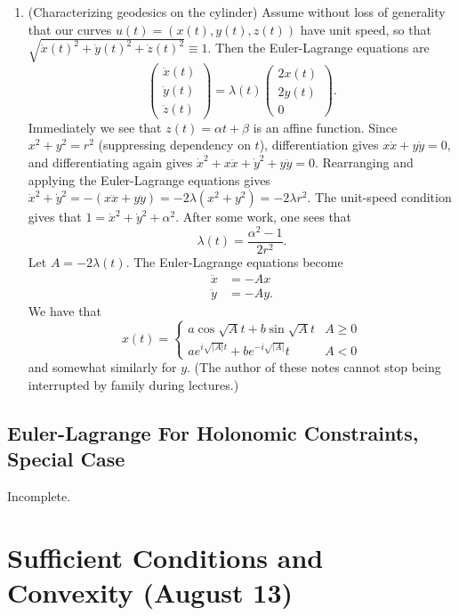 \documentclass[11pt]{book}
\begin{document}
\begin{enumerate}
\item
(Characterizing geodesics on the cylinder) Assume without loss of generality that our curves $u(t) = (x(t), y(t), z(t))$ have unit speed, so that $\sqrt{\dot{x}(t)^2 + \dot{y}(t)^2 + \dot{z}(t)^2} \equiv 1$. Then the Euler-Lagrange equations are
\[
\begin{pmatrix}
\ddot{x}(t) \\ \ddot{y}(t) \\ \ddot{z}(t)
\end{pmatrix} = \lambda(t) \begin{pmatrix}
2x(t) \\ 2y(t) \\ 0
\end{pmatrix}.
\]
Immediately we see that $z(t) = \alpha t + \beta$ is an affine function. Since $x^2 + y^2 = r^2$ (suppressing dependency on $t$), differentiation gives $x\dot{x} + y\dot{y} = 0$, and differentiating again gives $\dot{x}^2 + x\ddot{x} + \dot{y}^2 + y\ddot{y} = 0$. Rearranging and applying the Euler-Lagrange equations gives $\dot{x}^2 + \dot{y}^2 = -(x\ddot{x} + y\ddot{y}) = -2\lambda(x^2 + y^2) = -2\lambda r^2$. The unit-speed condition gives that $1 = \dot{x}^2 + \dot{y}^2 + \alpha^2$. After some work, one sees that
\[
\lambda(t) = \frac{\alpha^2 - 1}{2r^2}.
\]
Let $A = -2\lambda(t)$. The Euler-Lagrange equations become
\begin{align*}
\ddot{x} &= -A x \\
\ddot{y} &= -A y.
\end{align*}
We have that
\[
x(t) = \begin{cases}
a \cos \sqrt{A}t + b \sin \sqrt{A} t & A \geq 0 \\
a e^{i \sqrt{|A|} t} + b e^{-i \sqrt{|A|}}t & A < 0
\end{cases}
\]
and somewhat similarly for $y$. (The author of these notes cannot stop being interrupted by family during lectures.)
\end{enumerate}

\subsection{Euler-Lagrange For Holonomic Constraints, Special Case}

Incomplete.

\newpage

\section{Sufficient Conditions and Convexity (August 13)}
\end{document}
